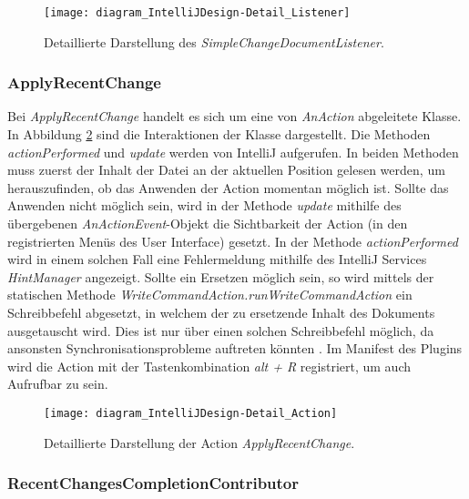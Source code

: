\begin{figure}
    \centering
    \texttt{[image: diagram\_IntelliJDesign-Detail\_Listener]}
    \caption{Detaillierte Darstellung des \emph{SimpleChangeDocumentListener}.}
    \label{fig:diagram_IntelliJDesign-Detail_Listener}
\end{figure}

\subsubsection{ApplyRecentChange}

Bei \emph{ApplyRecentChange} handelt es sich um eine von
\emph{AnAction} abgeleitete Klasse. In Abbildung
\ref{fig:diagram_IntelliJDesign-Detail_Action} sind die Interaktionen
der Klasse dargestellt. Die Methoden \emph{actionPerformed} und \emph{update}
werden von IntelliJ aufgerufen. In beiden Methoden muss zuerst
der Inhalt der Datei an der aktuellen Position gelesen werden, um 
herauszufinden, ob das Anwenden der Action momentan möglich ist.
Sollte das Anwenden nicht möglich sein, wird
in der Methode \emph{update} mithilfe des übergebenen
\emph{AnActionEvent}-Objekt die Sichtbarkeit der Action (in den
registrierten Menüs des User Interface) gesetzt.
In der Methode \emph{actionPerformed} wird in einem solchen Fall
eine Fehlermeldung mithilfe des IntelliJ Services \emph{HintManager}
angezeigt. Sollte ein Ersetzen möglich sein,
so wird mittels der statischen Methode 
\emph{WriteCommandAction.runWriteCommandAction} ein Schreibbefehl
abgesetzt, in welchem der zu ersetzende Inhalt des Dokuments 
ausgetauscht wird. Dies ist nur über einen solchen Schreibbefehl möglich,
da ansonsten Synchronisationsprobleme auftreten könnten
\cite{IntelliJPlatformSDKSafelyReplacingText,IntelliJPlatformSDKGeneralThreadingRules}.
Im Manifest des Plugins wird die Action mit der 
Tastenkombination \emph{alt + R} registriert, um
auch Aufrufbar zu sein.

\begin{figure}
    \centering
    \texttt{[image: diagram\_IntelliJDesign-Detail\_Action]}
    \caption{Detaillierte Darstellung der Action \emph{ApplyRecentChange}.}
    \label{fig:diagram_IntelliJDesign-Detail_Action}
\end{figure}

\subsubsection{RecentChangesCompletionContributor}

